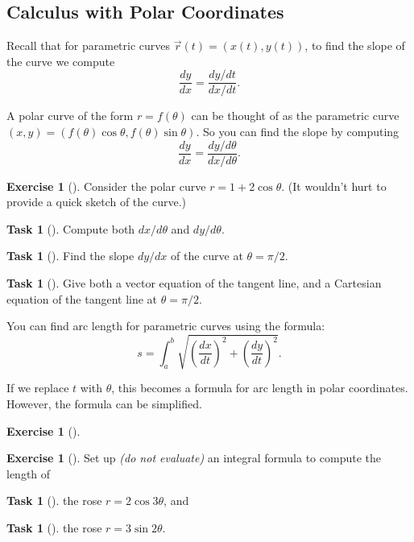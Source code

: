 \documentclass[10pt,]{book}
\theoremstyle{plain}
\theoremstyle{definition}
\theoremstyle{definition}
\theoremstyle{definition}
\theoremstyle{definition}
\newtheorem{exploration}[project]{Exercise}
\newtheorem{task}[project]{Task}
\theoremstyle{definition}
\numberwithin{equation}{section}
\begin{document}
\subsection[{Calculus with Polar Coordinates}]{Calculus with Polar Coordinates}\label{subsection-21}
Recall that for parametric curves \(\vec r(t) = (x(t),y(t))\), to find the slope of the curve we compute%
\begin{equation*}
\frac{dy}{dx}=\frac{dy/dt}{dx/dt}.
\end{equation*}
%
\par
A polar curve of the form \(r=f(\theta)\) can be thought of as the parametric curve \((x,y) = (f(\theta)\cos\theta,f(\theta)\sin\theta)\). So you can find the slope by computing%
\begin{equation*}
\frac{dy}{dx}=\frac{dy/d\theta}{dx/d\theta}.
\end{equation*}
%
\begin{exploration}[]\label{exploration-95}
Consider the polar curve \(r=1+2\cos \theta\). (It wouldn't hurt to provide a quick sketch of the curve.)%
\begin{task}[]\label{task-155}
Compute both \(dx/d\theta\) and \(dy/d\theta\).%
\end{task}
\begin{task}[]\label{task-156}
Find the slope \(dy/dx\) of the curve at \(\theta=\pi/2\).%
\end{task}
\begin{task}[]\label{task-157}
Give both a vector equation of the tangent line, and a Cartesian equation of the tangent line at \(\theta=\pi/2\).%
\end{task}
\end{exploration}
You can find arc length for parametric curves using the formula:%
\begin{equation*}
s=\int_a^b\sqrt{\left(\frac{dx}{dt}\right)^2+\left(\frac{dy}{dt}\right)^2}.
\end{equation*}
%
\par
If we replace \(t\) with \(\theta\), this becomes a formula for arc length in polar coordinates. However, the formula can be simplified.%
\begin{exploration}[]\label{exploration-96}
\end{exploration}
\begin{exploration}[]\label{exploration-97}
Set up \emph{(do not evaluate)} an integral formula to compute the length of%
\begin{task}[]\label{task-158}
the rose \(r=2\cos 3\theta\), and%
\end{task}
\begin{task}[]\label{task-159}
the rose \(r=3\sin 2\theta\).%
\end{task}
\end{exploration}
\typeout{************************************************}
\typeout{************************************************}
\end{document}
